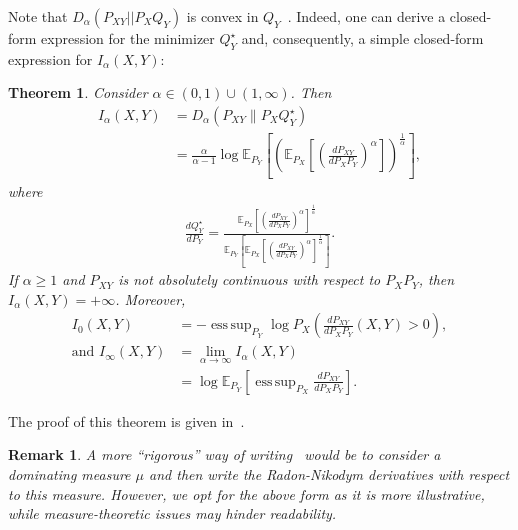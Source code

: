 \documentclass{article}
\newtheorem{theorem}{Theorem}
\numberwithin{theorem}{section}
\numberwithin{example}{section}
\newtheorem{remark}{Remark}
\numberwithin{remark}{section}
\numberwithin{definition}{section}
\newcommand{\E}{\mathbb{E}}
\DeclareMathOperator*{\esssup}{ess\,sup}
\newcommand{\range}{(0,1) \cup (1,\infty)}
\begin{document}
Note that $D_\alpha (P_{XY}|| P_XQ_Y)$ is convex in $Q_Y$~\cite[Theorem 12]{renyiDiv}. Indeed, one can derive a closed-form expression for the minimizer $Q^\star_Y$ and, consequently, a simple closed-form expression for $I_\alpha(X,Y)$:
\begin{theorem} \label{thm:Ialpha} Consider $\alpha \in \range$. Then
    \begin{align}
        I_\alpha(X,Y) &= D_\alpha(P_{XY}\|P_XQ^\star_Y)\label{thm:Ialpha-Eqn-defwithQstar}\\
        &=  \frac{\alpha}{\alpha-1} \log \E_{P_Y} \left[\left(\E_{P_X}\left[\left(\frac{dP_{XY}}{dP_XP_Y}\right)^\alpha\right]\right)^\frac{1}{\alpha}\right],\label{thm:Ialpha-Eqn-explicitdef}
    \end{align}
    where \begin{align} \label{eq:qstarIalpha}
        \frac{d Q^\star_Y}{d P_Y} = \frac{\E_{P_X} \left[   \left(  \frac{d P_{XY}}{ d P_{X} P_Y} \right)^\alpha \right]^{\frac{1}{\alpha}} }{ \E_{ P_Y} \left[ \E_{P_X} \left[   \left(  \frac{d P_{XY}}{ d P_{X} P_Y} \right)^\alpha \right]^{\frac{1}{\alpha}} \right] }.
    \end{align}
    If $\alpha \geq 1$ and $P_{XY}$ is not absolutely continuous with respect to $P_X P_Y$, then $I_\alpha(X,Y) = + \infty$.
   Moreover,
   \begin{align}
       I_0(X,Y) & =  - \esssup_{P_Y} \log P_X \left( \frac{dP_{XY}}{dP_XP_Y}(X,Y) > 0  \right), \\
       \text{and } I_\infty(X,Y) & =  \lim_{\alpha \to \infty} I_\alpha(X,Y)\nonumber \\  &= \log \E_{P_Y} \left[  \esssup_{P_X}  \frac{dP_{XY}}{dP_XP_Y} \right].
   \end{align}
\end{theorem}
The proof of this theorem is given in~.
\begin{remark}
    A more ``rigorous'' way of writing~ would be to consider a dominating measure $\mu$ and then write the Radon-Nikodym derivatives with respect to this measure. However, we opt for the above form as it is more illustrative, while measure-theoretic issues may hinder readability. 
\end{remark}
\end{document}
